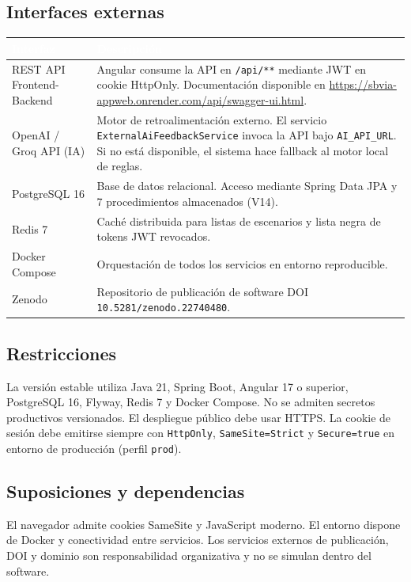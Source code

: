 \documentclass[11pt,a4paper]{article}
\begin{document}
\subsection{Interfaces externas}
\begin{table}[h]
    \centering
    \renewcommand{\arraystretch}{1.3}
    \begin{tabularx}{\textwidth}{@{}|l|X|@{}}
        \hline
        \rowcolor{uteqblue}
        \textcolor{white}{\textbf{Interfaz}} & \textcolor{white}{\textbf{Descripción}} \\ \hline
        REST API Frontend-Backend & Angular consume la API en \texttt{/api/**} mediante JWT en cookie HttpOnly. Documentación disponible en \url{https://sbvia-appweb.onrender.com/api/swagger-ui.html}. \\ \hline
        OpenAI / Groq API (IA) & Motor de retroalimentación externo. El servicio \texttt{ExternalAiFeedbackService} invoca la API bajo \texttt{AI\_API\_URL}. Si no está disponible, el sistema hace fallback al motor local de reglas. \\ \hline
        PostgreSQL 16 & Base de datos relacional. Acceso mediante Spring Data JPA y 7 procedimientos almacenados (V14). \\ \hline
        Redis 7 & Caché distribuida para listas de escenarios y lista negra de tokens JWT revocados. \\ \hline
        Docker Compose & Orquestación de todos los servicios en entorno reproducible. \\ \hline
        Zenodo & Repositorio de publicación de software DOI \texttt{10.5281/zenodo.22740480}. \\ \hline
    \end{tabularx}
\end{table}

\subsection{Restricciones}
La versión estable utiliza Java 21, Spring Boot, Angular 17 o superior, PostgreSQL 16, Flyway, Redis 7 y Docker Compose. No se admiten secretos productivos versionados. El despliegue público debe usar HTTPS. La cookie de sesión debe emitirse siempre con \texttt{HttpOnly}, \texttt{SameSite=Strict} y \texttt{Secure=true} en entorno de producción (perfil \texttt{prod}).

\subsection{Suposiciones y dependencias}
El navegador admite cookies SameSite y JavaScript moderno. El entorno dispone de Docker y conectividad entre servicios. Los servicios externos de publicación, DOI y dominio son responsabilidad organizativa y no se simulan dentro del software.
\end{document}
